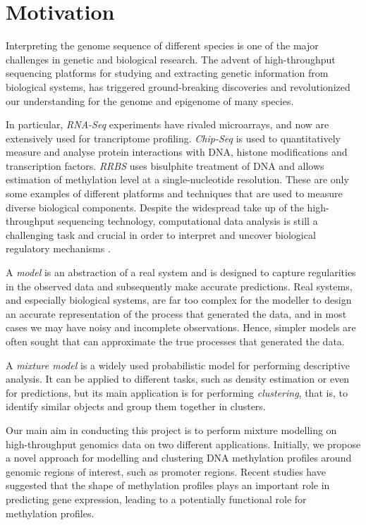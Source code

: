 \section{Motivation} \label{motivation-intro-l}
Interpreting the genome sequence of different species is one of the major challenges in genetic and biological research. The advent of high-throughput sequencing platforms for studying and extracting genetic information from biological systems, has triggered ground-breaking discoveries and revolutionized our understanding for the genome and epigenome of many species. 

In particular, \emph{RNA-Seq} experiments \citep{Wang2009} have rivaled microarrays, and now are extensively used for trancriptome profiling. \emph{Chip-Seq} \citep{Park2009} is used to quantitatively measure and analyse protein interactions with DNA, \ie histone modifications and transcription factors. \emph{RRBS} \citep{Meissner2005} uses bisulphite treatment of DNA and allows estimation of methylation level at a single-nucleotide resolution. These are only some examples of different platforms and techniques that are used to measure diverse biological components. Despite the widespread take up of the high-throughput sequencing technology, computational data analysis is still a challenging task and crucial in order to interpret and uncover biological regulatory mechanisms \citep{Park2009}.

A \emph{model} is an abstraction of a real system and is designed to capture regularities in the observed data and subsequently make accurate predictions. Real systems, and especially biological systems, are far too complex for the modeller to design an accurate representation of the process that generated the data, and in most cases we may have noisy and incomplete observations. Hence, simpler models are often sought that can approximate the true processes that generated the data.

A \emph{mixture model} is a widely used probabilistic model for performing descriptive analysis. It can be applied to different tasks, such as density estimation or even for predictions, but its main application is for performing \emph{clustering}, that is, to identify similar objects and group them together in clusters. 

Our main aim in conducting this project is to perform mixture modelling on high-throughput genomics data on two different applications. Initially, we propose a novel approach for modelling and clustering DNA methylation profiles around genomic regions of interest, such as promoter regions. Recent studies have suggested that the shape of methylation profiles plays an important role in predicting gene expression, leading to a potentially functional role for methylation profiles. 



